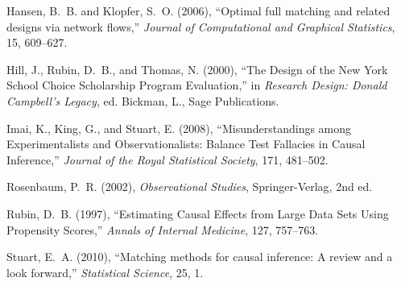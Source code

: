 \begin{frame}[allowframebreaks]
{\begin{thebibliography}{14}
Hansen, B.~B. and Klopfer, S.~O. (2006), \enquote{Optimal full matching and
  related designs via network flows,} \textit{Journal of Computational and
  Graphical Statistics}, 15, 609--627.

Hill, J., Rubin, D.~B., and Thomas, N. (2000), \enquote{The Design of the New
  York School Choice Scholarship Program Evaluation,} in \textit{Research
  Design: Donald Campbell's Legacy}, ed. Bickman, L., Sage Publications.

Imai, K., King, G., and Stuart, E. (2008), \enquote{Misunderstandings among
  Experimentalists and Observationalists: Balance Test Fallacies in Causal
  Inference,} \textit{Journal of the Royal Statistical Society}, 171, 481--502.

Rosenbaum, P.~R. (2002), \textit{Observational Studies}, Springer-Verlag, 2nd
  ed.

Rubin, D.~B. (1997), \enquote{Estimating Causal Effects from Large Data Sets
  Using Propensity Scores,} \textit{Annals of Internal Medicine}, 127,
  757--763.

Stuart, E.~A. (2010), \enquote{{Matching methods for causal inference: A review
  and a look forward},} \textit{Statistical Science}, 25, 1.

\end{thebibliography}

}
\end{frame}



